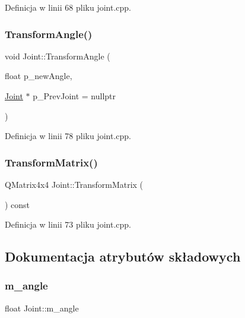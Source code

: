 Definicja w linii 68 pliku joint.\+cpp.

\mbox{\label{class_joint_ad2529cc3d781c18ead369c0ea42b700b}} 
\subsubsection{\texorpdfstring{Transform\+Angle()}{TransformAngle()}}
{\footnotesize\ttfamily void Joint\+::\+Transform\+Angle (\begin{DoxyParamCaption}\item[{float}]{p\+\_\+new\+Angle,  }\item[{\hyperlink{class_joint}{Joint} $\ast$}]{p\+\_\+\+Prev\+Joint = {\ttfamily nullptr} }\end{DoxyParamCaption})}



Definicja w linii 78 pliku joint.\+cpp.

\mbox{\label{class_joint_a0bf632e9b7a8de79429be16f963e81f7}} 
\subsubsection{\texorpdfstring{Transform\+Matrix()}{TransformMatrix()}}
{\footnotesize\ttfamily Q\+Matrix4x4 Joint\+::\+Transform\+Matrix (\begin{DoxyParamCaption}{ }\end{DoxyParamCaption}) const}



Definicja w linii 73 pliku joint.\+cpp.



\subsection{Dokumentacja atrybutów składowych}
\mbox{\label{class_joint_a293274b0f6de50fb79f532f64af9a048}} 
\subsubsection{\texorpdfstring{m\+\_\+angle}{m\_angle}}
{\footnotesize\ttfamily float Joint\+::m\+\_\+angle\hspace{0.3cm}{\ttfamily [protected]}}



